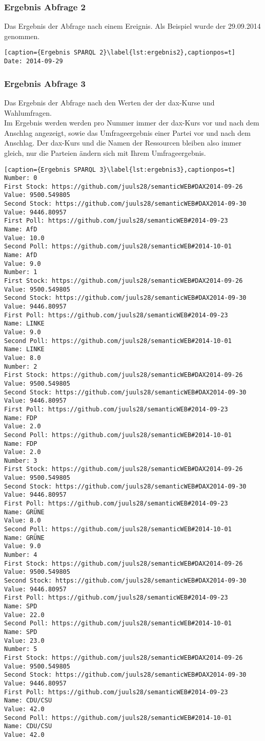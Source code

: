 \documentclass[a4paper,10pt,parskip]{article}
\begin{document}
\subsubsection{Ergebnis Abfrage 2}
Das Ergebnis der Abfrage nach einem Ereignis. Als Beispiel wurde der 29.09.2014 genommen.
\begin{lstlisting}[caption={Ergebnis SPARQL 2}\label{lst:ergebnis2},captionpos=t] 
Date: 2014-09-29
\end{lstlisting}
\subsubsection{Ergebnis Abfrage 3}
Das Ergebnis der Abfrage nach den Werten der der \ac{dax}-Kurse und Wahlumfragen.\\
Im Ergebnis werden werden pro Nummer immer der \ac{dax}-Kurs vor und nach dem Anschlag angezeigt, sowie das Umfrageergebnis einer Partei vor und nach dem Anschlag. Der \ac{dax}-Kurs und die Namen der Ressourcen bleiben also immer gleich, nur die Parteien ändern sich mit Ihrem Umfrageergebnis.
\begin{lstlisting}[caption={Ergebnis SPARQL 3}\label{lst:ergebnis3},captionpos=t] 
Number: 0
First Stock: https://github.com/juuls28/semanticWEB#DAX2014-09-26
Value: 9500.549805
Second Stock: https://github.com/juuls28/semanticWEB#DAX2014-09-30
Value: 9446.80957
First Poll: https://github.com/juuls28/semanticWEB#2014-09-23
Name: AfD
Value: 10.0
Second Poll: https://github.com/juuls28/semanticWEB#2014-10-01
Name: AfD
Value: 9.0
Number: 1
First Stock: https://github.com/juuls28/semanticWEB#DAX2014-09-26
Value: 9500.549805
Second Stock: https://github.com/juuls28/semanticWEB#DAX2014-09-30
Value: 9446.80957
First Poll: https://github.com/juuls28/semanticWEB#2014-09-23
Name: LINKE
Value: 9.0
Second Poll: https://github.com/juuls28/semanticWEB#2014-10-01
Name: LINKE
Value: 8.0
Number: 2
First Stock: https://github.com/juuls28/semanticWEB#DAX2014-09-26
Value: 9500.549805
Second Stock: https://github.com/juuls28/semanticWEB#DAX2014-09-30
Value: 9446.80957
First Poll: https://github.com/juuls28/semanticWEB#2014-09-23
Name: FDP
Value: 2.0
Second Poll: https://github.com/juuls28/semanticWEB#2014-10-01
Name: FDP
Value: 2.0
Number: 3
First Stock: https://github.com/juuls28/semanticWEB#DAX2014-09-26
Value: 9500.549805
Second Stock: https://github.com/juuls28/semanticWEB#DAX2014-09-30
Value: 9446.80957
First Poll: https://github.com/juuls28/semanticWEB#2014-09-23
Name: GRÜNE
Value: 8.0
Second Poll: https://github.com/juuls28/semanticWEB#2014-10-01
Name: GRÜNE
Value: 9.0
Number: 4
First Stock: https://github.com/juuls28/semanticWEB#DAX2014-09-26
Value: 9500.549805
Second Stock: https://github.com/juuls28/semanticWEB#DAX2014-09-30
Value: 9446.80957
First Poll: https://github.com/juuls28/semanticWEB#2014-09-23
Name: SPD
Value: 22.0
Second Poll: https://github.com/juuls28/semanticWEB#2014-10-01
Name: SPD
Value: 23.0
Number: 5
First Stock: https://github.com/juuls28/semanticWEB#DAX2014-09-26
Value: 9500.549805
Second Stock: https://github.com/juuls28/semanticWEB#DAX2014-09-30
Value: 9446.80957
First Poll: https://github.com/juuls28/semanticWEB#2014-09-23
Name: CDU/CSU
Value: 42.0
Second Poll: https://github.com/juuls28/semanticWEB#2014-10-01
Name: CDU/CSU
Value: 42.0
\end{lstlisting}
\end{document}
